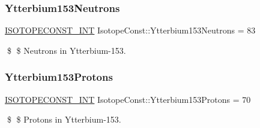 \subsubsection{\texorpdfstring{Ytterbium153\+Neutrons}{Ytterbium153Neutrons}}
{\footnotesize\ttfamily \mbox{\hyperlink{group___isotope_const-_macros_ga5f18360b3e99483a35c32d789e62621c}{I\+S\+O\+T\+O\+P\+E\+C\+O\+N\+S\+T\+\_\+\+I\+NT}} Isotope\+Const\+::\+Ytterbium153\+Neutrons = 83}

\$ \$ Neutrons in Ytterbium-\/153. \mbox{\label{group___isotope_const-_ytterbium-_yb153_ga4ad35a76db32188f08efd2da1fc6dd08}} 
\subsubsection{\texorpdfstring{Ytterbium153\+Protons}{Ytterbium153Protons}}
{\footnotesize\ttfamily \mbox{\hyperlink{group___isotope_const-_macros_ga5f18360b3e99483a35c32d789e62621c}{I\+S\+O\+T\+O\+P\+E\+C\+O\+N\+S\+T\+\_\+\+I\+NT}} Isotope\+Const\+::\+Ytterbium153\+Protons = 70}

\$ \$ Protons in Ytterbium-\/153. 